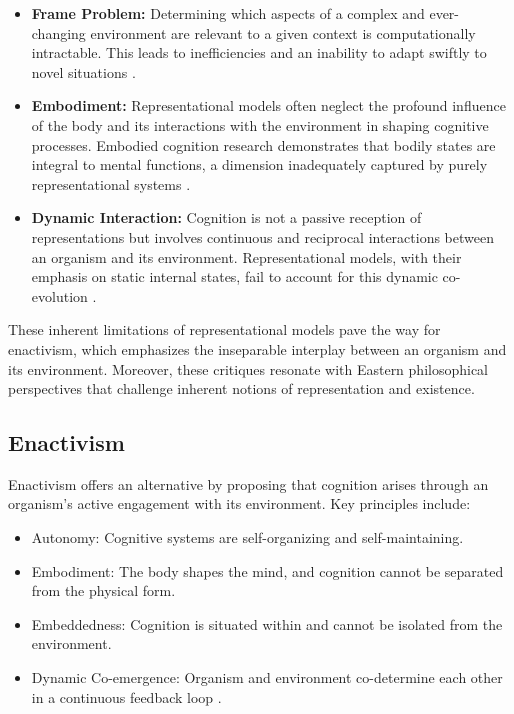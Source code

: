 \documentclass{article}
\begin{document}
\begin{itemize}
    \item \textbf{Frame Problem:} Determining which aspects of a complex and ever-changing environment are relevant to a given context is computationally intractable. This leads to inefficiencies and an inability to adapt swiftly to novel situations \cite{pylyshyn1987}.
    \item \textbf{Embodiment:} Representational models often neglect the profound influence of the body and its interactions with the environment in shaping cognitive processes. Embodied cognition research demonstrates that bodily states are integral to mental functions, a dimension inadequately captured by purely representational systems \cite{clark1997}.
    \item \textbf{Dynamic Interaction:} Cognition is not a passive reception of representations but involves continuous and reciprocal interactions between an organism and its environment. Representational models, with their emphasis on static internal states, fail to account for this dynamic co-evolution \cite{thompson2007}.
\end{itemize}

These inherent limitations of representational models pave the way for enactivism, which emphasizes the inseparable interplay between an organism and its environment. Moreover, these critiques resonate with Eastern philosophical perspectives that challenge inherent notions of representation and existence.

\subsection{Enactivism}

Enactivism offers an alternative by proposing that cognition arises through an organism's active engagement with its environment. Key principles include:

\begin{itemize} \item Autonomy: Cognitive systems are self-organizing and self-maintaining. \item Embodiment: The body shapes the mind, and cognition cannot be separated from the physical form. \item Embeddedness: Cognition is situated within and cannot be isolated from the environment. \item Dynamic Co-emergence: Organism and environment co-determine each other in a continuous feedback loop \cite{varela1991}. \end{itemize}
\end{document}
